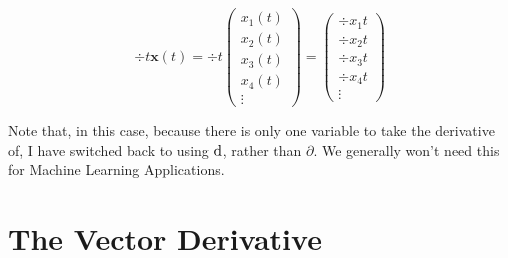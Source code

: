 \documentclass[a4paper,openany,11pt]{book}
\renewcommand\vec[1]{\boldsymbol{\mathbf{#1}}}
\begin{document}
			\begin{equation}
				\div{}{t} \vec{x}(t) = \div{}{t} \begin{pmatrix} x_1(t) \\ x_2(t) \\ x_3(t) \\ x_4(t) \\\vdots \end{pmatrix} = \begin{pmatrix} \div{x_1}{t} \\ \div{x_2}{t} \\ \div{x_3}{t} \\ \div{x_4}{t} \\ \vdots \end{pmatrix}
			\end{equation}

			Note that, in this case, because there is only one variable to take the derivative of, I have switched back to using $\mathrm d$, rather than $\partial$. We generally won't need this for Machine Learning Applications.

		\section{The Vector Derivative}
\end{document}
